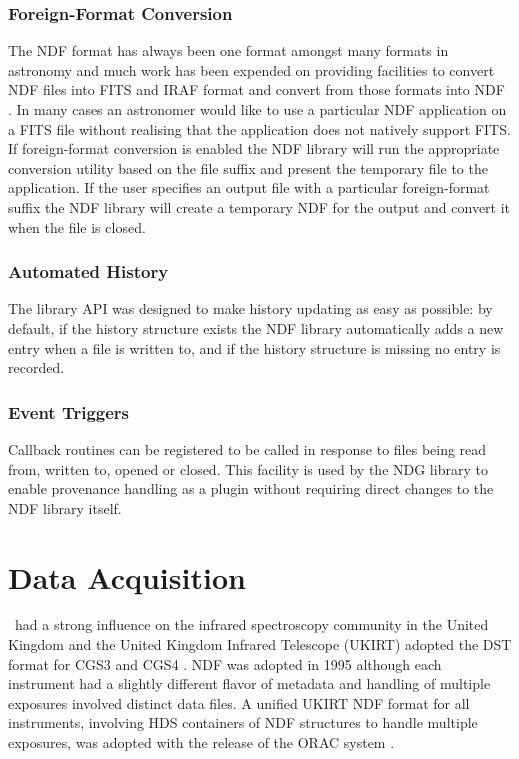 \documentclass[final,authoryear,5p,times,twocolumn]{elsarticle}
\begin{document}
\subsubsection{Foreign-Format Conversion}

The NDF format has always been one format amongst many formats in astronomy and much work has been
expended on providing facilities to convert NDF files into FITS and
IRAF format and convert from those formats into NDF \citep{SUN55}. In
many cases an astronomer would like to use a particular NDF
application on a FITS file without realising that the application does
not natively support FITS. If foreign-format conversion is enabled the
NDF library will run the appropriate conversion utility based on the
file suffix and present the temporary file to the application. If the
user specifies an output file with a particular foreign-format suffix
the NDF library will create a temporary NDF for the output and convert
it when the file is closed.

\subsubsection{Automated History}

The library API was designed to make history updating as easy
as possible: by default, if the history structure exists the NDF
library automatically adds a new entry when a file is written
to, and if the history structure is missing no entry is recorded.

\subsubsection{Event Triggers}

Callback routines can be registered to be called in response to files
being read from, written to, opened or closed. This facility is used
by the NDG library \citep{SUN2} to enable provenance handling
as a plugin without requiring direct changes to the NDF library itself.

\section{Data Acquisition}
\label{sec:daq}

\figaro\ had a strong influence on the infrared spectroscopy community
in the United Kingdom and the United Kingdom Infrared Telescope
(UKIRT) adopted the DST format for CGS3 and CGS4 \citep{1993SPIE.1946..547W}. NDF was adopted in
1995 although each instrument had a slightly different flavor of
metadata and handling of multiple exposures involved distinct data
files. A unified UKIRT NDF format for all instruments, involving HDS
containers of NDF structures to handle multiple exposures, was
adopted with the release of the ORAC system \citep{2000SPIE.4009..227B}.
\end{document}
